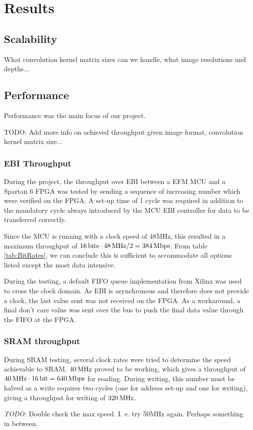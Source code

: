 \section{Results}


\subsection{Scalability}
What convolution kernel matrix sizes can we handle, what image resolutions and depths...

\subsection{Performance}
Performance was the main focus of our project.

TODO: Add more info on achieved throughput given image format, convolution kernel matrix size...

\subsubsection{EBI Throughput} \label{subsec:EbiThroughput}
During the project, the throughput over EBI between a EFM MCU and a Spartan 6 FPGA was tested by sending a sequence of increasing number which were verified on the FPGA.
A set-up time of 1 cycle was required in addition to the mandatory cycle always introduced by the MCU EBI controller for data to be transferred correctly.

Since the MCU is running with a clock speed of 48MHz, this resulted in a maximum throughput of $\unit[16]{bits} \cdot \unit[48]{MHz} / 2 = \unit[384]{Mbps}$.
From table \ref{tab:BitRates}, we can conclude this is sufficient to accommodate all options listed except the most data intensive.

During the testing, a default FIFO queue implementation from Xilinx was used to cross the clock domain.
As EBI is asynchronous and therefore does not provide a clock, the last value sent was not received on the FPGA.
As a workaround, a final don't care value was sent over the bus to push the final data value through the FIFO at the FPGA.

\subsubsection{SRAM throughput} \label{subsec:SramThroughput}
During SRAM testing, several clock rates were tried to determine the speed achievable to SRAM.
$\unit[40]{MHz}$ proved to be working, which gives a throughput of $\unit[40]{MHz}\cdot\unit[16]{bit} = \unit[640]{Mbps}$ for reading.
During writing, this number must be halved as a write requires two cycles (one for address set-up and one for writing), giving a throughput for writing of $\unit[320]{MHz}$.

\emph{TODO:} Double check the max speed. I. e. try 50MHz again. Perhaps something in between.
